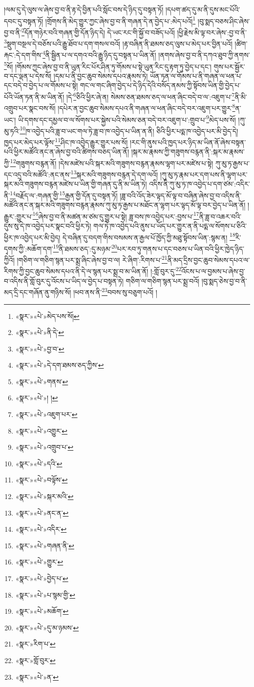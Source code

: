 །ལམ་དུ་དེ་ལུས་ལ་ཞེས་བྱ་བ་ནི་རྟ་དེ་བྱིན་པའི་སློང་བས་དེ་ཉིད་དུ་བསྟན་ཏོ། །དཔག་ཚད་དུ་མ་ནི་དུས་མང་པོའི་དབང་དུ་བསྟན་ཏོ། །གྲོགས་ནི་མེད་གྱུར་ཀྱང་ཞེས་བྱ་བ་ནི་གཞན་དེ་ན་བྱེད་པ་:མེད་པའོ།\footnote{«སྣར་»«པེ་»མེད་པས་སོ།} །བུ་སྨད་བཅས་ཤིང་ཞེས་བྱ་བ་ནི་\footnote{«སྣར་»«པེ་»ནི་དེ་}དོན་གཉེར་བའི་གཞན་གྱི་དོན་ཉིད་དེ། དེ་ཡང་རང་གི་སྐྱོ་བ་བཟོད་པའོ། །ཕྱི་རྗེས་མི་ལྟ་བར་ཞེས་:བྱ་བ་ནི་\footnote{«སྣར་»«པེ་»བྱ་བ་}སྡུག་བསྔལ་དེ་བཅོས་པའི་རྒྱུ་ཐོབ་པ་དག་གསལ་བའོ། །རྟ་བཞིན་ནི་ཐམས་ཅད་ལུས་པ་མེད་པར་བྱིན་པའོ། །ཚིག་རྐང་:དེ་དག་གིས་\footnote{«སྣར་»«པེ་»དེ་དག་ཐམས་ཅད་ཀྱིས་}ནི་སྦྱིན་པ་ལ་དགའ་བའི་རྒྱུ་ཉིད་དུ་བསྟན་པ་ཡིན་ནོ། །ནགས་ཞེས་བྱ་བ་ནི་དཀའ་ཐུབ་ཀྱི་ནགས་\footnote{«སྣར་»«པེ་»གནས་}སོ། །གོམས་ཀྱང་ཞེས་བྱ་བ་ནི་ཡུན་རིང་པོར་ཤིན་ཏུ་གོམས་པ་སྟེ་ཡུན་རིང་དུ་རྟག་ཏུ་བྱེད་པ་དང་། གུས་པར་སྦྱོར་བ་དང་ལྡན་པ་དེས་སོ། །དམ་པ་ནི་བྱང་ཆུབ་སེམས་དཔའ་རྣམས་ཏེ། ཡོན་ཏན་ལ་གོམས་པ་ནི་གཞན་ལ་ཕན་པ་དང་བདེ་བ་བྱེད་པ་ལ་གོམས་པ་སྟེ། གང་ལ་གང་ཞིག་བྱེད་པ་དེ་ཉིད་དེའི་བསོད་ནམས་ཀྱི་སྟོབས་ཡིན་གྱི་བྱེད་པ་པོའི་ཡོན་ཏན་ནི་མ་ཡིན་ནོ། །དེ་\footnote{«སྣར་»«པེ་»། །}ཅིའི་ཕྱིར་ཞེ་ན། སེམས་ཅན་ཐམས་ཅད་ལ་ཕན་ཞིང་བདེ་བ་ལ་:འཇུག་པ་\footnote{«སྣར་»«པེ་»འཇུག་པར་}ནི་མི་འགྲུབ་པར་སྣང་བས་སོ། །དཔེར་ན་བྱང་ཆུབ་སེམས་དཔའ་ནི་གཞན་ལ་ཕན་ཞིང་བདེ་བར་འཇུག་པར་གྱུར་\footnote{«སྣར་»«པེ་»འགྱུར་}ན་ཡང་། ཡི་དགས་དང་དམྱལ་བ་ལ་སོགས་པར་སྐྱེས་པའི་སེམས་ཅན་བདེ་བར་འཇུག་པ་:གྲུབ་པ་\footnote{«སྣར་»«པེ་»འགྲུབ་པ་}མེད་པས་སོ། །ཀུ་མུ་ཏའི་\footnote{«སྣར་»«པེ་»དའི་}ཁ་འབྱེད་པའི་ཟླ་བ་ཡང་གལ་ཏེ་ཟླ་བ་ཁ་འབྱེད་པ་ཡིན་ན་ནི། ཅིའི་ཕྱིར་པདྨ་ཁ་འབྱེད་པར་མི་བྱེད་དེ། ཁྱད་པར་མེད་པར་ལྟོས་\footnote{«སྣར་»«པེ་»བལྟོས་}ཤིང་ཁ་འབྱེད་རྒྱུར་གྱུར་པས་སོ། །རང་གི་ནུས་པའི་ཁྱད་པར་ཉིད་མ་ཡིན་ནོ་ཞེས་བསྟན་པའི་ཕྱིར་མཚོའི་ནང་ན་ཞེས་བྱ་བའི་ཚིགས་བཅད་ཡིན་ནོ། །སྐར་མ་རྣམས་ཀྱི་གཟུགས་བརྙན་ནི་:སྐར་མ་རྣམས་ཀྱི་\footnote{«སྣར་»«པེ་»སྐར་མའི་}གཟུགས་བརྙན་ནོ། །དེས་མཛེས་པའི་སྐར་མའི་གཟུགས་བརྙན་རྣམས་ལྷག་པར་མཛེས་པ་སྟེ། ཀུ་མུ་ཏ་རྒྱས་པ་དང་འདྲ་བའི་མཚོའི་:ནང་ནས་\footnote{«སྣར་»«པེ་»ནང་ན་}སྐར་མའི་གཟུགས་བརྙན་དེ་དག་ལའོ། །ཀུ་མུ་ཏ་རྣམ་པར་དག་པས་ནི་ལྷག་པར་སྐར་མའི་གཟུགས་བརྙན་མཛེས་པ་ཡིན་གྱི་གཞན་དུ་ནི་མ་ཡིན་ཏེ། འདིས་ནི་ཀུ་མུ་ཏ་ཁ་འབྱེད་པ་དག་ཙམ་:འདིར་ནི་\footnote{«སྣར་»«པེ་»འདིར་}བརྗོད་ལ་:གཞན་གྱི་\footnote{«སྣར་»«པེ་»གཞན་ནི་}རྒྱན་གྱི་དོན་དུ་བསྟན་ཏོ། །ཟླ་བའི་འོད་ཟེར་ལྟད་མོ་ལྟ་བ་བཞིན་ཞེས་བྱ་བ་འདིས་ནི་མཚོའི་ནང་ན་སྐར་མའི་གཟུགས་བརྙན་རྣམས་ཀུ་མུ་ཏ་རྒྱས་པ་མཐོང་ན་ལྷག་པར་ལྟད་མོ་ལྟ་བར་བྱེད་པ་ཡིན་ནོ། །རྒྱུར་:གྱུར་པ་\footnote{«སྣར་»«པེ་»གྱུར་}ཞེས་བྱ་བ་ནི་མཚན་མ་ཙམ་དུ་གྱུར་པ་སྟེ། ཟླ་བས་ཁ་འབྱེད་པར་:བྱས་པ་\footnote{«སྣར་»«པེ་»བྱེད་པ་}ནི་ཟླ་བ་འཆར་བའི་དུས་སུ་དེ་ཁ་འབྱེད་པར་སྣང་བའི་ཕྱིར་ཏེ། གལ་ཏེ་ཁ་འབྱེད་པའི་ནུས་པ་ཡོད་པར་གྱུར་ན་ནི་པདྨ་ལ་སོགས་པ་ཅིའི་ཕྱིར་ཁ་འབྱེད་པར་མི་བྱེད། དེ་བཞིན་དུ་བདག་གིས་བསམས་ན་རྒྱལ་པོ་ཁྱོད་ཀྱི་མཐུ་སྟོབས་ཡིན་:སྙམ་ན། \footnote{«སྣར་»«པེ་»པ་སྙམ་གྱི་}རི་དྭགས་ཀྱི་:མཆོག་དག་\footnote{«སྣར་»«པེ་»མཆོག་}ནི་ཐམས་ཅད་:དུ་མཉམ་\footnote{«སྣར་»«པེ་»དུ་མ་ཉམས་}པར་རབ་ཏུ་གནས་པ་དང་བཅས་པ་ཡིན་བའི་ཕྱིར་ཁྱེད་ཉིད་ཀྱིའོ། །གཅིག་ལ་གཅིག་སྙན་པར་སྨྲ་ཞིང་ཞེས་བྱ་བ་ལ། རེ་ཞིག་:རིགས་པ་\footnote{«སྣར་»རིག་པ་}ནི་མད་དྲིས་བྱང་ཆུབ་སེམས་དཔའ་ལ་རིགས་ཀྱི་བྱང་ཆུབ་སེམས་དཔའ་ནི་དེ་ལ་སྙན་པར་སྨྲ་བ་མ་ཡིན་ནོ། །:གློ་བུར་དུ་\footnote{«སྣར་»གློ་བུར་}འོངས་པ་ལ་བྱམས་པ་ཞེས་བྱ་བ་འདིས་ནི་གློ་བུར་དུ་འོངས་པ་ཡིད་ལ་བྱེད་པ་བསྟན་ཏེ། གཅིག་ལ་གཅིག་སྙན་པར་སྨྲ་བའོ། །བུ་སྨད་ཅེས་བྱ་བ་ནི་མད་དྲི་དང་གཞོན་ནུ་གཉིས་སོ། །ཕབ་ནས་ནི་\footnote{«སྣར་»«པེ་»ན་}བབས་སུ་བཅུག་པའོ། །
